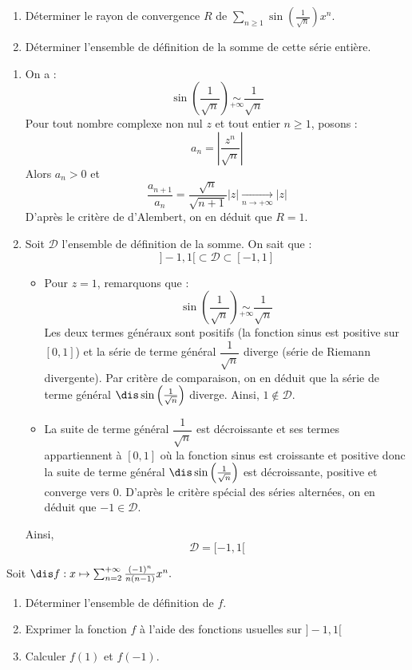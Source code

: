 \documentclass[a4paper,10pt]{report}
\newcommand{\Sum}[2]{\ensuremath{\textstyle{\sum\limits_{#1}^{#2}}}}
\begin{document}
\begin{Exa} \begin{enumerate}
\item Déterminer le rayon de convergence $R$ de $\Sum{n \geq 1}{} \sin \left( \frac{1}{\sqrt{n}} \right) x^n$.
\item Déterminer l'ensemble de définition de la somme de cette série entière.
\end{enumerate}
\end{Exa}

\corr 

\begin{enumerate}
\item On a :
$$ \sin \left( \frac{1}{\sqrt{n}} \right) \underset{+ \infty}{\sim} \dfrac{1}{\sqrt{n}}$$
Pour tout nombre complexe non nul $z$ et tout entier $n \geq 1$, posons :
$$  a_n = \left\vert \dfrac{z^n}{ \sqrt{n}} \right\vert$$
Alors $a_n>0$ et 
$$ \dfrac{a_{n+1}}{a_n} = \dfrac{\sqrt{n}}{\sqrt{n+1}} \vert z \vert \underset{ n \rightarrow+ \infty}{\longrightarrow} \vert z \vert$$
D'après le critère de d'Alembert, on en déduit que $R=1$.
\item Soit $\mathcal{D}$ l'ensemble de définition de la somme. On sait que : 
$$ ]-1,1[ \subset \mathcal{D} \subset [-1,1]$$
\begin{itemize}
\item Pour $z=1$, remarquons que :
$$ \sin \left( \frac{1}{\sqrt{n}} \right) \underset{+ \infty}{\sim} \dfrac{1}{\sqrt{n}} $$
Les deux termes généraux sont positifs (la fonction sinus est positive sur $[0,1]$) et la série de terme général $\dfrac{1}{\sqrt{n}}$ diverge (série de Riemann divergente). Par critère de comparaison, on en déduit que la série de terme général $\dis \sin \left( \frac{1}{\sqrt{n}} \right)$ diverge. Ainsi, $1 \notin \mathcal{D}$.
\item La suite de terme général $\dfrac{1}{\sqrt{n}}$ est décroissante et ses termes appartiennent à $[0,1]$ où la fonction sinus est croissante et positive donc la suite de terme général $\dis \sin \left( \frac{1}{\sqrt{n}} \right)$ est décroissante, positive et converge vers $0$. D'après le critère spécial des séries alternées, on en déduit que $-1 \in \mathcal{D}$.
\end{itemize}
Ainsi,
$$ \mathcal{D}= [-1,1[$$
\end{enumerate}

\begin{Exa} Soit $\dis f : x \mapsto \sum_{n = 2}^{ + \infty} \frac{( - 1)^{n}}{n(n - 1)}x^{n}.$

  \begin{enumerate}
  \item
    Déterminer l'ensemble de définition de $f$.
  \item
    Exprimer la fonction $f$ à l'aide des fonctions usuelles sur $] - 1,1[$
  \item Calculer $f(1)$ et $f( - 1)$.
  \end{enumerate}
  \end{Exa} 
  
\end{document}

